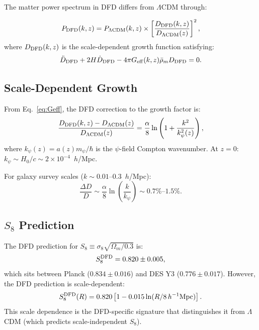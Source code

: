 \documentclass[11pt,a4paper]{article}
\theoremstyle{remark}
\begin{document}
The matter power spectrum in DFD differs from $\Lambda$CDM through:

\begin{equation}
P_{\rm DFD}(k, z) = P_{\Lambda\rm CDM}(k, z) \times \left[\frac{D_{\rm DFD}(k,z)}{D_{\Lambda\rm CDM}(z)}\right]^2,
\end{equation}
where $D_{\rm DFD}(k,z)$ is the scale-dependent growth function satisfying:
\begin{equation}
\ddot{D}_{\rm DFD} + 2H\dot{D}_{\rm DFD} - 4\pi G_{\rm eff}(k,z)\bar\rho_m D_{\rm DFD} = 0.
\end{equation}

\subsection{Scale-Dependent Growth}

From Eq.~\eqref{eq:Geff}, the DFD correction to the growth factor is:
\begin{equation}
\frac{D_{\rm DFD}(k,z) - D_{\Lambda\rm CDM}(z)}{D_{\Lambda\rm CDM}(z)}
= \frac{\alpha}{8}\ln\left(1 + \frac{k^2}{k_\psi^2(z)}\right),
\end{equation}
where $k_\psi(z) = a(z)m_\psi/\hbar$ is the $\psi$-field Compton wavenumber.
At $z = 0$: $k_\psi \sim H_0/c \sim 2 \times 10^{-4}$~$h$/Mpc.

For galaxy survey scales ($k \sim 0.01$--$0.3$~$h$/Mpc):
\begin{equation}
\frac{\Delta D}{D} \sim \frac{\alpha}{8}\ln\left(\frac{k}{k_\psi}\right) \sim 0.7\%\text{--}1.5\%.
\end{equation}

\subsection{$S_8$ Prediction}

The DFD prediction for $S_8 \equiv \sigma_8\sqrt{\Omega_m/0.3}$ is:
\begin{equation}
S_8^{\rm DFD} = 0.820 \pm 0.005,
\end{equation}
which sits between Planck ($0.834 \pm 0.016$) and DES Y3 ($0.776 \pm 0.017$).
However, the DFD prediction is scale-dependent:
\begin{equation}
S_8^{\rm DFD}(R) = 0.820\left[1 - 0.015\ln(R/8\,h^{-1}\text{Mpc})\right].
\end{equation}
This scale dependence is the DFD-specific signature that distinguishes it
from $\Lambda$CDM (which predicts scale-independent $S_8$).
\end{document}
